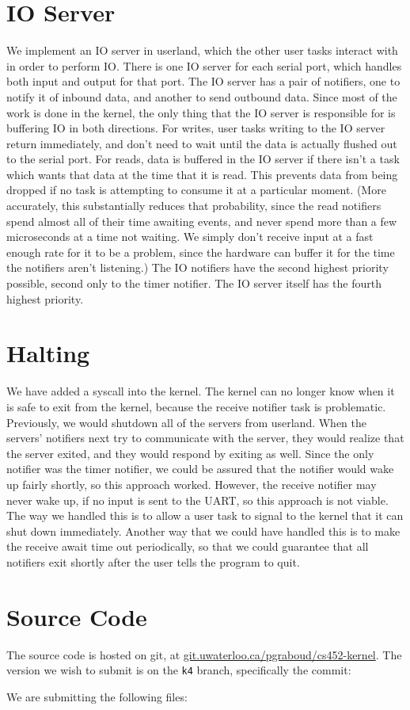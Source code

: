 \documentclass[titlepage]{article}
\begin{document}
\section{IO Server}
We implement an IO server in userland, which the other user tasks interact with
in order to perform IO.
There is one IO server for each serial port, which handles both input and output
for that port.
The IO server has a pair of notifiers, one to notify it of inbound data, and another
to send outbound data.
Since most of the work is done in the kernel, the only thing that the IO server
is responsible for is buffering IO in both directions.
For writes, user tasks writing to the IO server return immediately, and don't need
to wait until the data is actually flushed out to the serial port.
For reads, data is buffered in the IO server if there isn't a task which wants
that data at the time that it is read.
This prevents data from being dropped if no task is attempting to consume it at a particular moment.
(More accurately, this substantially reduces that probability, since the read notifiers
spend almost all of their time awaiting events, and never spend more than a few microseconds
at a time not waiting. We simply don't receive input at a fast enough rate for it to be a problem, since
the hardware can buffer it for the time the notifiers aren't listening.)
The IO notifiers have the second highest priority possible, second only to the timer notifier.
The IO server itself has the fourth highest priority.

\section{Halting}
We have added a  syscall into the kernel.
The kernel can no longer know when it is safe to exit from the kernel,
because the receive notifier task is problematic.
Previously, we would shutdown all of the servers from userland.
When the servers' notifiers next try to communicate with the server, they would realize
that the server exited, and they would respond by exiting as well.
Since the only notifier was the timer notifier, we could be assured that the notifier
would wake up fairly shortly, so this approach worked.
However, the receive notifier may never wake up, if no input is sent to the UART,
so this approach is not viable.
The way we handled this is to allow a user task to signal to the kernel that it
can shut down immediately.
Another way that we could have handled this is to make the receive await time out
periodically, so that we could guarantee that all notifiers exit shortly after
the user tells the program to quit.

\section{Source Code}
The source code is hosted on git, at \url{git.uwaterloo.ca/pgraboud/cs452-kernel}.
The version we wish to submit is on the \texttt{k4} branch, specifically
the commit:

We are submitting the following files:


\end{document}
